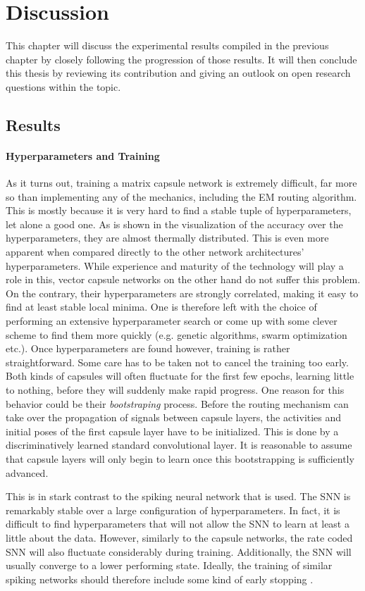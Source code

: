 \chapter{Discussion}\label{chapter:discussion}
This chapter will discuss the experimental results compiled in the previous chapter by closely following the progression of those results. It will then conclude this thesis by reviewing its contribution and giving an outlook on open research questions within the topic.
\section{Results}
\subsubsection{Hyperparameters and Training}
As it turns out, training a matrix capsule network is extremely difficult, far more so than implementing any of the mechanics, including the EM routing algorithm. This is mostly because it is very hard to find a stable tuple of hyperparameters, let alone a good one. As is shown in the visualization of the accuracy over the hyperparameters, they are almost thermally distributed. This is even more apparent when compared directly to the other network architectures’ hyperparameters. While experience and maturity of the technology will play a role in this, vector capsule networks on the other hand do not suffer this problem. On the contrary, their hyperparameters are strongly correlated, making it easy to find at least stable local minima. One is therefore left with the choice of performing an extensive hyperparameter search or come up with some clever scheme to find them more quickly (e.g. genetic algorithms, swarm optimization etc.).  Once hyperparameters are found however, training is rather straightforward. Some care has to be taken not to cancel the training too early. Both kinds of capsules will often fluctuate for the first few epochs, learning little to nothing, before they will suddenly make rapid progress. One reason for this behavior could be their \emph{bootstraping} process. Before the routing mechanism can take over the propagation of signals between capsule layers, the activities and initial poses of the first capsule layer have to be initialized. This is done by a discriminatively learned standard convolutional layer. It is reasonable to assume that capsule layers will only begin to learn once this bootstrapping is sufficiently advanced.

This is in stark contrast to the spiking neural network that is used. The SNN is remarkably stable over a large configuration of hyperparameters. In fact, it is difficult to find hyperparameters that will not allow the SNN to learn at least a little about the data. However, similarly to the capsule networks, the rate coded SNN will also fluctuate considerably during training. Additionally, the SNN will usually converge to a lower performing state. Ideally, the training of similar spiking networks should therefore include some kind of early stopping \cite{ prechelt1998automatic}.\noindent

